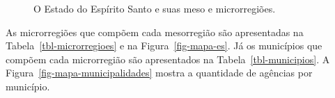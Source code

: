 \documentclass[
  12pt,
  twoside,
  openright,
  a4paper,
  chapter=TITLE,
  section=TITLE,
  brazil]{abntex2}
\begin{document}
\begin{figure}
\begin{minipage}{0.50\linewidth}

\end{minipage}%
\newline
\begin{minipage}{0.50\linewidth}



\end{minipage}%

\caption{\label{fig-mapas-es}O Estado do Espírito Santo e suas meso e
microrregiões.}

\end{figure}%

As microrregiões que compõem cada mesorregião são apresentadas na
Tabela~\ref{tbl-microrregioes} e na Figura~\ref{fig-mapa-es}. Já os
municípios que compõem cada microrregião são apresentados na
Tabela~\ref{tbl-municipios}. A Figura~\ref{fig-mapa-municipalidades}
mostra a quantidade de agências por município.
\end{document}
